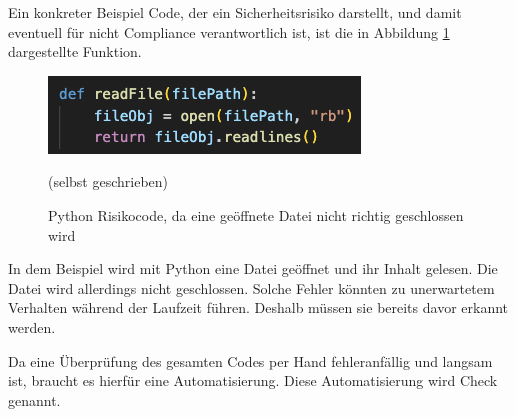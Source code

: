 \documentclass[../main.tex]{subfiles}
\begin{document}
Ein konkreter Beispiel Code, der ein Sicherheitsrisiko darstellt, und damit eventuell für nicht Compliance verantwortlich ist, ist die in Abbildung \ref{fig:codecompliance} dargestellte Funktion.

\begin{figure}[ht]
    \centering
    \includegraphics[scale=1]{bilder/CodeScreenShot.png}
    \caption{Python Risikocode, da eine geöffnete Datei nicht richtig geschlossen wird}
    \footnotesize (selbst geschrieben)
    \label{fig:codecompliance}
\end{figure}

In dem Beispiel wird mit Python eine Datei geöffnet und ihr Inhalt gelesen.
Die Datei wird allerdings nicht geschlossen.
Solche Fehler könnten zu unerwartetem Verhalten während der Laufzeit führen.
Deshalb müssen sie bereits davor erkannt werden.

Da eine Überprüfung des gesamten Codes per Hand fehleranfällig und langsam ist, braucht es hierfür eine Automatisierung.
Diese Automatisierung wird Check genannt.
\end{document}
